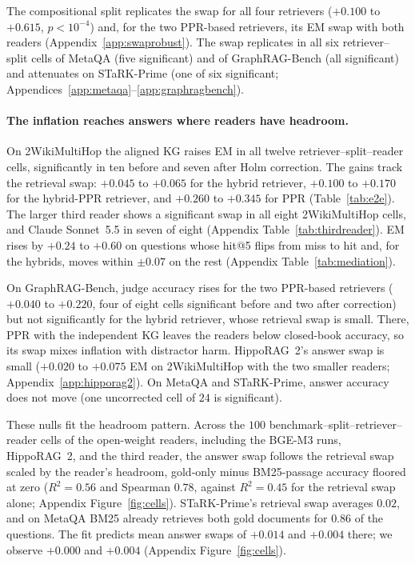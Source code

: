 \documentclass[11pt]{article}
\begin{document}
The compositional split replicates the swap for all four retrievers ($+0.100$ to $+0.615$, $p<10^{-4}$) and, for the two PPR-based retrievers, its EM swap with both readers (Appendix~\ref{app:swaprobust}). The swap replicates in all six retriever--split cells of MetaQA (five significant) and of GraphRAG-Bench (all significant) and attenuates on STaRK-Prime (one of six significant; Appendices~\ref{app:metaqa}--\ref{app:graphragbench}).

\paragraph{The inflation reaches answers where readers have headroom.} On 2WikiMultiHop the aligned KG raises EM in all twelve retriever--split--reader cells, significantly in ten before and seven after Holm correction. The gains track the retrieval swap: $+0.045$ to $+0.065$ for the hybrid retriever, $+0.100$ to $+0.170$ for the hybrid-PPR retriever, and $+0.260$ to $+0.345$ for PPR (Table~\ref{tab:e2e}). The larger third reader shows a significant swap in all eight 2WikiMultiHop cells, and Claude Sonnet~5.5 in seven of eight (Appendix Table~\ref{tab:thirdreader}). EM rises by $+0.24$ to $+0.60$ on questions whose hit@5 flips from miss to hit and, for the hybrids, moves within $\pm0.07$ on the rest (Appendix Table~\ref{tab:mediation}).

On GraphRAG-Bench, judge accuracy rises for the two PPR-based retrievers ($+0.040$ to $+0.220$, four of eight cells significant before and two after correction) but not significantly for the hybrid retriever, whose retrieval swap is small. There, PPR with the independent KG leaves the readers below closed-book accuracy, so its swap mixes inflation with distractor harm. HippoRAG~2's answer swap is small ($+0.020$ to $+0.075$ EM on 2WikiMultiHop with the two smaller readers; Appendix~\ref{app:hipporag2}). On MetaQA and STaRK-Prime, answer accuracy does not move (one uncorrected cell of $24$ is significant).

These nulls fit the headroom pattern. Across the $100$ benchmark--split--retriever--reader cells of the open-weight readers, including the BGE-M3 runs, HippoRAG~2, and the third reader, the answer swap follows the retrieval swap scaled by the reader's headroom, gold-only minus BM25-passage accuracy floored at zero ($R^2=0.56$ and Spearman $0.78$, against $R^2=0.45$ for the retrieval swap alone; Appendix Figure~\ref{fig:cells}). STaRK-Prime's retrieval swap averages $0.02$, and on MetaQA BM25 already retrieves both gold documents for $0.86$ of the questions. The fit predicts mean answer swaps of $+0.014$ and $+0.004$ there; we observe $+0.000$ and $+0.004$ (Appendix Figure~\ref{fig:cells}).
\end{document}
